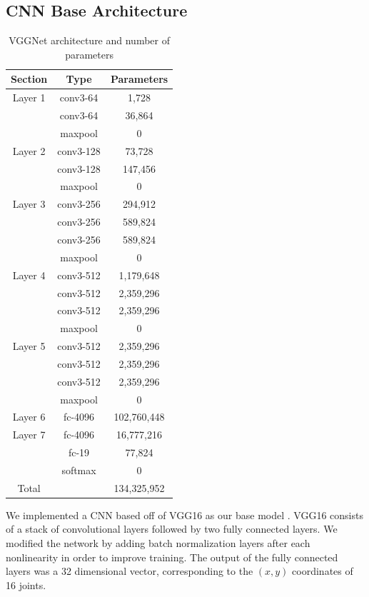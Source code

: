 \documentclass[11pt,twocolumn,letterpaper]{article}
\begin{document}
\subsection{CNN Base Architecture}

\begin{table}
\begin{center}
\begin{tabular}{| c | c | c |}
\hline
Section & Type & Parameters\\
\hline\hline
Layer 1 & conv3-64 & 1,728\\
&conv3-64 & 36,864\\
&maxpool & 0\\
Layer 2&conv3-128 & 73,728\\
&conv3-128 & 147,456\\
&maxpool & 0\\
Layer 3&conv3-256 & 294,912\\
&conv3-256 & 589,824\\
&conv3-256 & 589,824\\
&maxpool & 0\\
Layer 4&conv3-512 & 1,179,648\\
&conv3-512 & 2,359,296\\
&conv3-512 & 2,359,296\\
&maxpool & 0\\
Layer 5&conv3-512 & 2,359,296\\
&conv3-512 & 2,359,296\\
&conv3-512 & 2,359,296\\
&maxpool & 0\\
Layer 6&fc-4096 & 102,760,448\\
Layer 7&fc-4096 & 16,777,216\\
&fc-19 & 77,824\\
&softmax & 0\\
\hline
Total & & 134,325,952\\
\hline
\end{tabular}
\end{center}
\caption{VGGNet architecture and number of parameters}
\label{vgg_arch}
\end{table}


We implemented a CNN based off of VGG16 as our base model \cite{simonyan2014very}. 
VGG16 consists of a stack of convolutional layers followed by two fully connected layers.
We modified the network
by adding batch normalization layers after each nonlinearity in order to improve training.
The output of the fully connected layers was a 32 dimensional vector, corresponding to
the $(x, y)$ coordinates of 16 joints.
\end{document}
